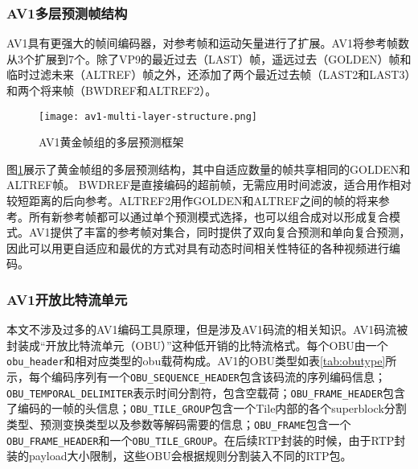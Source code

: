 \subsubsection{AV1多层预测帧结构}

AV1具有更强大的帧间编码器，对参考帧和运动矢量进行了扩展。AV1将参考帧数从3个扩展到7个。除了VP9的最近过去（LAST）帧，遥远过去（GOLDEN）帧和临时过滤未来（ALTREF）帧之外，还添加了两个最近过去帧（LAST2和LAST3）和两个将来帧（BWDREF和ALTREF2）\cite{linEfficientAV1Video2018}。

\begin{figure}[!htp]
	\centering
	\texttt{[image: av1-multi-layer-structure.png]}
	\caption{AV1黄金帧组的多层预测框架\cite{chenOverviewCoreCoding2018}}
	\label{fig:av1-multi-layer-structure}
\end{figure}

图\ref{fig:av1-multi-layer-structure}展示了黄金帧组的多层预测结构\cite{chenOverviewCoreCoding2018}，其中自适应数量的帧共享相同的GOLDEN和ALTREF帧。 BWDREF是直接编码的超前帧，无需应用时间滤波，适合用作相对较短距离的后向参考。ALTREF2用作GOLDEN和ALTREF之间的帧的将来参考。所有新参考帧都可以通过单个预测模式选择，也可以组合成对以形成复合模式。AV1提供了丰富的参考帧对集合，同时提供了双向复合预测和单向复合预测，因此可以用更自适应和最优的方式对具有动态时间相关性特征的各种视频进行编码。

\subsubsection{AV1开放比特流单元}
本文不涉及过多的AV1编码工具原理，但是涉及AV1码流的相关知识。AV1码流被封装成“开放比特流单元（OBU）”这种低开销的比特流格式。每个OBU由一个\texttt{obu\_header}和相对应类型的obu载荷构成。AV1的OBU类型如表\ref{tab:obutype}所示，每个编码序列有一个\texttt{OBU\_SEQUENCE\_HEADER}包含该码流的序列编码信息；\texttt{OBU\_TEMPORAL\_DELIMITER}表示时间分割符，包含空载荷；\texttt{OBU\_FRAME\_HEADER}包含了编码的一帧的头信息；\texttt{OBU\_TILE\_GROUP}包含一个Tile内部的各个superblock分割类型、预测变换类型以及参数等解码需要的信息；\texttt{OBU\_FRAME}包含一个\texttt{OBU\_FRAME\_HEADER}和一个\texttt{OBU\_TILE\_GROUP}。在后续RTP封装的时候，由于RTP封装的payload大小限制，这些OBU会根据规则分割装入不同的RTP包。

